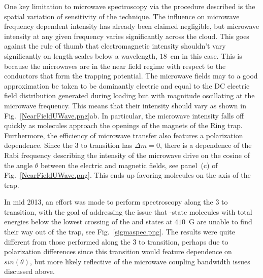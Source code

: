 One key limitation to microwave spectroscopy via the procedure described is the spatial variation of sensitivity of the technique.
The influence on microwave frequency dependent intensity has already been claimed negligible, but microwave intensity at any given frequency varies significantly across the cloud.
This goes against the rule of thumb that electromagnetic intensity shouldn't vary significantly on length-scales below a wavelength, $18$~cm in this case.
This is because the microwaves are in the near field regime with respect to the conductors that form the trapping potential.
The microwave fields may to a good approximation be taken to be dominantly electric and equal to the DC electric field distribution generated during loading but with magnitude oscillating at the microwave frequency.
This means that their intensity should vary as shown in Fig.~\ref{NearFieldUWave.png}ab.
In particular, the microwave intensity falls off quickly as molecules approach the openings of the magnets of the Ring trap.
Furthermore, the efficiency of microwave transfer also features a polarization dependence.
Since the \f3 to  transition has $\Delta m=0$, there is a dependence of the Rabi frequency describing the intensity of the microwave drive on the cosine of the angle $\theta$ between the electric and magnetic fields, see panel~(c) of Fig.~\ref{NearFieldUWave.png}.
This ends up favoring molecules on the axis of the trap.


In mid 2013, an effort was made to perform spectroscopy along the \f3 to  transition, with the goal of addressing the issue that -state molecules with total energies below the lowest crossing of the  and  states at $410$~G are unable to find their way out of the trap, see Fig.~\ref{sigmaspec.png}.
The results were quite different from those performed along the \f3 to  transition, perhaps due to polarization differences since this transition would feature dependence on $sin(\theta)$, but more likely reflective of the microwave coupling bandwidth issues discussed above.

